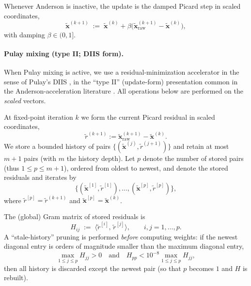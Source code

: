 Whenever Anderson is inactive, the update is the damped Picard step in scaled coordinates,
\begin{equation}\label{eq:picard-damped}
\widetilde{\mathbf{x}}^{(k+1)} \;:=\; \widetilde{\mathbf{x}}^{(k)} + \beta\big(\widetilde{\mathbf{x}}_{\mathrm{raw}}^{(k+1)}-\widetilde{\mathbf{x}}^{(k)}\big),
\end{equation}
with damping $\beta\in(0,1]$.

\paragraph{Pulay mixing (type II; DIIS form).}
When Pulay mixing is active, we use a residual-minimization accelerator in the sense of Pulay's DIIS \cite{Pulay1980_ConvergenceAcceleration}, in the ``type II'' (update-form) presentation common in the Anderson-acceleration literature \cite{Walker2011_AndersonAcceleration}.
All operations below are performed on the \emph{scaled} vectors.

At fixed-point iteration $k$ we form the current Picard residual in scaled coordinates,
\[
\widetilde{r}^{(k+1)} := \widetilde{\mathbf{x}}_{\mathrm{raw}}^{(k+1)}-\widetilde{\mathbf{x}}^{(k)}.
\]
We store a bounded history of pairs $\{(\widetilde{\mathbf{x}}^{(j)},\widetilde{r}^{(j+1)})\}$ and retain at most $m{+}1$ pairs (with $m$ the history depth). Let $p$ denote the number of stored pairs (thus $1\le p\le m{+}1$), ordered from oldest to newest, and denote the stored residuals and iterates by
\[
\{(\widetilde{\mathbf{x}}^{[1]},\widetilde{r}^{[1]}),\dots,(\widetilde{\mathbf{x}}^{[p]},\widetilde{r}^{[p]})\},
\]
where $\widetilde{r}^{[p]}=\widetilde{r}^{(k+1)}$ and $\widetilde{\mathbf{x}}^{[p]}=\widetilde{\mathbf{x}}^{(k)}$.

The (global) Gram matrix of stored residuals is
\begin{equation}\label{eq:aa-gram}
H_{ij} \;:=\; \langle \widetilde{r}^{[i]},\,\widetilde{r}^{[j]} \rangle, \qquad i,j=1,\dots,p.
\end{equation}
A ``stale-history'' pruning is performed \emph{before} computing weights: if the newest diagonal entry is orders of magnitude smaller than the maximum diagonal entry,
\[
\max_{1\le j\le p} H_{jj} > 0\quad \text{and}\quad H_{pp} < 10^{-8}\max_{1\le j\le p} H_{jj},
\]
then all history is discarded except the newest pair (so that $p$ becomes $1$ and $H$ is rebuilt).

